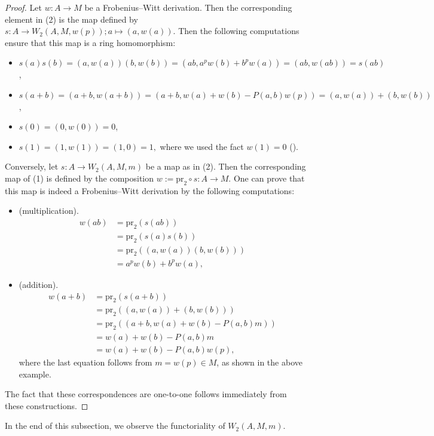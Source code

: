 \documentclass[11pt, a4paper]{amsart}
\theoremstyle{plain}
\theoremstyle{definition}
\begin{document}
\begin{proof}
    Let $w:A\to M$ be a Frobenius--Witt derivation. Then the corresponding element in (2) is the map defined by $s:A\to W_2(A,M,w(p));a\mapsto(a,w(a))$. Then the following computations ensure that this map is a ring homomorphism:\begin{itemize}
        \item $s(a)s(b)=(a,w(a))(b,w(b))=(ab,a^pw(b)+b^pw(a))=(ab,w(ab))=s(ab)$,
        \item $s(a+b)=(a+b,w(a+b))=(a+b,w(a)+w(b)-P(a,b)w(p))=(a,w(a))+(b,w(b))$,
        \item $s(0)=(0,w(0))=0$,
        \item $s(1)=(1,w(1))=(1,0)=1,$ where we used the fact $w(1)=0$ (\cite[Lemma 1.2]{Sai22}).
    \end{itemize}


    Conversely, let $s:A\to W_2(A,M,m)$ be a map as in (2). Then the corresponding map of (1) is defined by the composition $w:=\mathrm{pr}_2\circ s:A\to M$. One can prove that this map is indeed a Frobenius--Witt derivation by the following computations:\begin{itemize}
        \item (multiplication).\begin{align*}
            w(ab)&=\mathrm{pr}_2(s(ab))\\&=\mathrm{pr}_2(s(a)s(b))\\&=\mathrm{pr}_2((a,w(a))(b,w(b)))\\&=a^pw(b)+b^pw(a),
        \end{align*}
        \item (addition).\begin{align*}
             w(a+b)&=\mathrm{pr}_2(s(a+b))\\&=\mathrm{pr}_2((a,w(a))+(b,w(b)))\\&=\mathrm{pr}_2((a+b,w(a)+w(b)-P(a,b)m))\\&=w(a)+w(b)-P(a,b)m\\&=w(a)+w(b)-P(a,b)w(p),
        \end{align*} where the last equation follows from $m=w(p)\in M$, as shown in the above example.
        
    \end{itemize}
    The fact that these correspondences are one-to-one follows immediately from these constructions.
\end{proof}

In the end of this subsection, we observe the functoriality of $W_2(A,M,m)$. 
\end{document}
